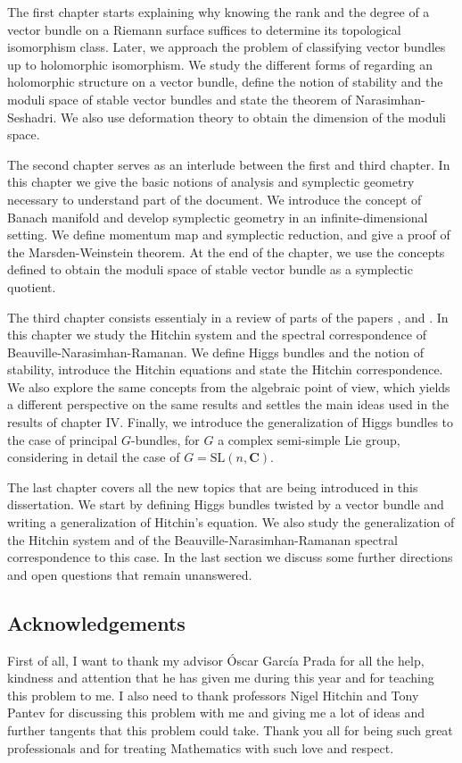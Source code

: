 \documentclass[12pt,a4paper]{book}
\theoremstyle{definition} \newtheorem{defn}[thm]{Definition}
\theoremstyle{definition} \newtheorem{ejemplo}[thm]{Example}
\theoremstyle{remark} \newtheorem{rem}[thm]{Remark}
\def\CC{\mathbf{C}}
\def\SL{\mathrm{SL}}
\begin{document}
The first chapter starts explaining why knowing the rank and the degree of a vector bundle on a Riemann surface suffices to determine its topological isomorphism class. Later, we approach the problem of classifying vector bundles up to holomorphic isomorphism. We study the different forms of regarding an holomorphic structure on a vector bundle, define the notion of stability and the moduli space of stable vector bundles and state the theorem of Narasimhan-Seshadri. We also use deformation theory to obtain the dimension of the moduli space.

The second chapter serves as an interlude between the first and third chapter. In this chapter we give the basic notions of analysis and symplectic geometry necessary to understand part of the document. We introduce the concept of Banach manifold and develop symplectic geometry in an infinite-dimensional setting. We define momentum map and symplectic reduction, and give a proof of the Marsden-Weinstein theorem. At the end of the chapter, we use the concepts defined to obtain the moduli space of stable vector bundle as a symplectic quotient.

The third chapter consists essentialy in a review of parts of the papers \cite{hitchinselfduality}, \cite{hitchinsystem} and \cite{bnr}. In this chapter we study the Hitchin system and the spectral correspondence of Beauville-Narasimhan-Ramanan. We define Higgs bundles and the notion of stability, introduce the Hitchin equations and state the Hitchin correspondence. We also explore the same concepts from the algebraic point of view, which yields a different perspective on the same results and settles the main ideas used in the results of chapter IV. Finally, we introduce the generalization of Higgs bundles to the case of principal $G$-bundles, for $G$ a complex semi-simple Lie group, considering in detail the case of $G=\SL(n,\CC)$.

The last chapter covers all the new topics that are being introduced in this dissertation. We start by defining Higgs bundles twisted by a vector bundle and writing a generalization of Hitchin's equation. We also study the generalization of the Hitchin system and of the Beauville-Narasimhan-Ramanan spectral correspondence to this case. In the last section we discuss some further directions and open questions that remain unanswered.

\subsection*{Acknowledgements}
First of all, I want to thank my advisor Óscar García Prada for all the help, kindness and attention that he has given me during this year and for teaching this problem to me. I also need to thank professors Nigel Hitchin and Tony Pantev for discussing this problem with me and giving me a lot of ideas and further tangents that this problem could take. Thank you all for being such great professionals and for treating Mathematics with such love and respect.
\end{document}

